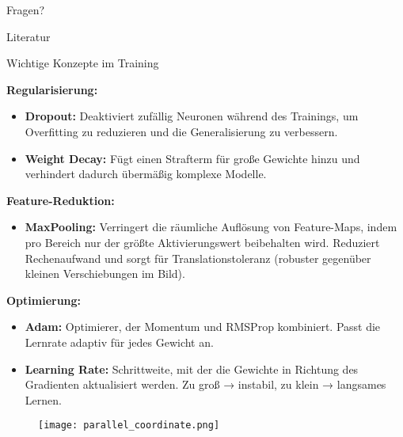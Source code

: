 \begin{frame}[label=conclusion, standout]
  Fragen?
\end{frame}

\appendix

\begin{frame}{Literatur}
  \nocite{*}
  \printbibliography[heading=none]
\end{frame}

\begin{frame}[allowframebreaks]{Wichtige Konzepte im Training}


\textbf{Regularisierung:}
\begin{itemize}
    \item \textbf{Dropout:} Deaktiviert zufällig Neuronen während des Trainings, um Overfitting zu reduzieren und die Generalisierung zu verbessern.
    \item \textbf{Weight Decay:} Fügt einen Strafterm für große Gewichte hinzu und verhindert dadurch übermäßig komplexe Modelle.
\end{itemize}

\textbf{Feature-Reduktion:}
\begin{itemize}
    \item \textbf{MaxPooling:} Verringert die räumliche Auflösung von Feature-Maps, indem pro Bereich nur der größte Aktivierungswert beibehalten wird.  
    Reduziert Rechenaufwand und sorgt für Translationstoleranz (robuster gegenüber kleinen Verschiebungen im Bild).
\end{itemize}

\textbf{Optimierung:}
\begin{itemize}
    \item \textbf{Adam:} Optimierer, der Momentum und RMSProp kombiniert. Passt die Lernrate adaptiv für jedes Gewicht an.
    \item \textbf{Learning Rate:} Schrittweite, mit der die Gewichte in Richtung des Gradienten aktualisiert werden.  
    Zu groß → instabil, zu klein → langsames Lernen.
\end{itemize}

\end{frame}

\begin{frame}
  \begin{figure}
    \centering
    \texttt{[image: parallel\_coordinate.png]}
  \end{figure}
\end{frame}

